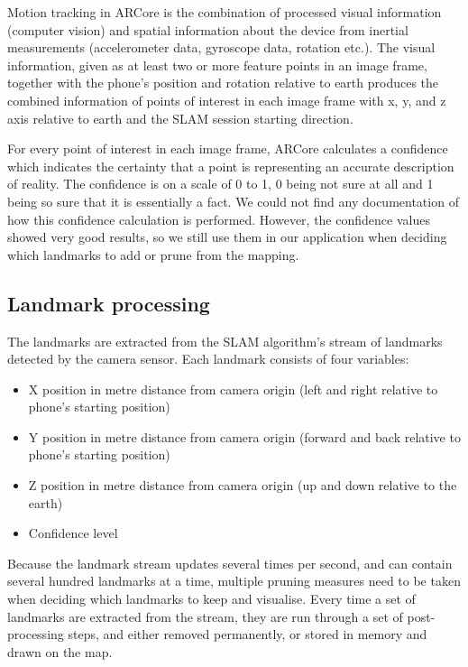 \documentclass{article}
\begin{document}
Motion tracking in ARCore is the combination of processed visual information (computer vision) and spatial information about the device from inertial measurements (accelerometer data, gyroscope data, rotation etc.). The visual information, given as at least two or more feature points in an image frame, together with the phone's position and rotation relative to earth produces the combined information of points of interest in each image frame with x, y, and z axis relative to earth and the SLAM session starting direction. \cite{ARCore}

For every point of interest in each image frame, ARCore calculates a confidence which indicates the certainty that a point is representing an accurate description of reality. The confidence is on a scale of 0 to 1, 0 being not sure at all and 1 being so sure that it is essentially a fact. We could not find any documentation of how this confidence calculation is performed. However, the confidence values showed very good results, so we still use them in our application when deciding which landmarks to add or prune from the mapping.

\subsection{Landmark processing} \label{landmark-processing}

The landmarks are extracted from the SLAM algorithm's stream of landmarks detected by the camera sensor. Each landmark consists of four variables:
\begin{itemize}
    \item X position in metre distance from camera origin (left and right relative to phone's starting position)
    \item Y position in metre distance from camera origin (forward and back relative to phone's starting position)
    \item Z position in metre distance from camera origin (up and down relative to the earth)
    \item Confidence level
\end{itemize}
Because the landmark stream updates several times per second, and can contain several hundred landmarks at a time, multiple pruning measures need to be taken when deciding which landmarks to keep and visualise. Every time a set of landmarks are extracted from the stream, they are run through a set of post-processing steps, and either removed permanently, or stored in memory and drawn on the map.
\end{document}
